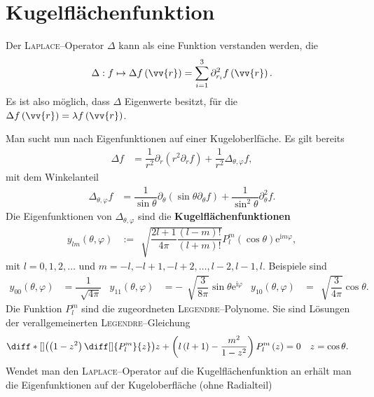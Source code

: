 \documentclass[a4paper,12pt]{article}
\numberwithin{equation}{section}
\begin{document}
\section{Kugelflächenfunktion}
Der \textsc{Laplace}--Operator $\Delta$ kann als eine Funktion verstanden werden, die
\begin{align} 
        \Delta :f\mapsto \Delta f\left(\vv{r}\right)=\sum_{i=1}^{3}\partial _{r_i}^2 f\left(\vv{r}\right)
.\end{align} 
Es ist also möglich, dass $\Delta$ Eigenwerte besitzt, für die $\Delta f\left(\vv{r}\right)=\lambda f\left(\vv{r}\right)$.\par
Man sucht nun nach Eigenfunktionen auf einer Kugeloberlfäche. Es gilt bereits
\begin{align} 
        \Delta f&=\dfrac{1}{r^2}\partial_r \left(r^2\partial_r f\right)+\dfrac{1}{r^2}\Delta _{\theta ,\varphi }f
,\end{align} 
mit dem Winkelanteil 
\begin{align} 
        \Delta _{\theta ,\varphi }f&=\dfrac{1}{\sin \theta }\partial _\theta \left(\sin \theta \partial_\theta  f\right)+\dfrac{1}{\sin ^2\theta }\partial_\theta ^2 f
.\end{align} 
Die Eigenfunktionen von $\Delta _{\theta ,\varphi }$ sind die \textbf{Kugelflächenfunktionen}
\begin{align} 
        y_{lm}\left(\theta ,\varphi \right)&:=\,\sqrt[]{\dfrac{2l+1}{4\pi }\dfrac{\left(l-m\right)!}{\left(l+m\right)!}}P_l^m \left(\cos \theta \right)\text{e}^{\text{i}m\varphi }
,\end{align} 
mit $l=0,1,2,\hdots $ und $m=-l,-l+1,-l+2,\hdots ,l-2,l-1,l$. Beispiele sind
\begin{align} 
        y_{00}\left(\theta ,\varphi \right)&=\dfrac{1}{\,\sqrt[]{4\pi }}&y_{11}\left(\theta ,\varphi \right)&=-\,\sqrt[]{\dfrac{3}{8\pi }}\sin \theta \text{e}^{\text{i}\varphi }&y_{10}\left(\theta ,\varphi \right)&=\,\sqrt[]{\dfrac{3}{4\pi }}\cos \theta 
.\end{align}
Die Funktion $P_l^m$ sind die zugeordneten \textsc{Legendre}--Polynome. Sie sind Lösungen der verallgemeinerten \textsc{Legendre}--Gleichung
\begin{align} 
        \diff*[]{\left(\left(1-z^2\right)\diff[]{P_l^m}{z}\right)}{z}+\left(l\left(l+1\right)-\dfrac{m^2}{1-z^2}\right)P_l^m\left(z\right)&=0&z&=\cos \theta 
.\end{align} 
Wendet man den \textsc{Laplace}--Operator auf die Kugelflächenfunktion an erhält man die Eigenfunktionen auf der Kugeloberfläche (ohne Radialteil)
\end{document}
